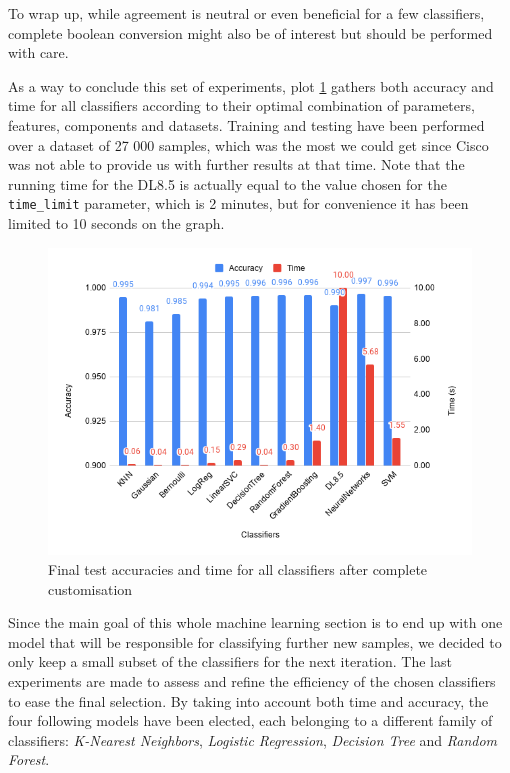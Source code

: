 \begin{itemize}
    To wrap up, while agreement is neutral or even beneficial for a few classifiers, complete boolean conversion might also be of interest but should be performed with care.
\end{itemize}

As a way to conclude this set of experiments, plot \ref{fig:final_results} gathers both accuracy and time for all classifiers according to their optimal combination of parameters, features, components and datasets. Training and testing have been performed over a dataset of 27 000 samples, which was the most we could get since Cisco was not able to provide us with further results at that time. Note that the running time for the DL8.5 is actually equal to the value chosen for the \texttt{time\_limit} parameter, which is 2 minutes, but for convenience it has been limited to 10 seconds on the graph.

\begin{figure}[!ht]
\centering
  \includegraphics[width=\textwidth]{Figures/final_results.png}
  \captionsetup{justification=centering}
  \caption{Final test accuracies and time for all classifiers after complete customisation}
  \label{fig:final_results}
\end{figure}

Since the main goal of this whole machine learning section is to end up with one model that will be responsible for classifying further new samples, we decided to only keep a small subset of the classifiers for the next iteration. The last experiments are made to assess and refine the efficiency of the chosen classifiers to ease the final selection. By taking into account both time and accuracy, the four following models have been elected, each belonging to a different family of classifiers:  \textit{K-Nearest Neighbors}, \textit{Logistic Regression}, \textit{Decision Tree} and \textit{Random Forest}.

